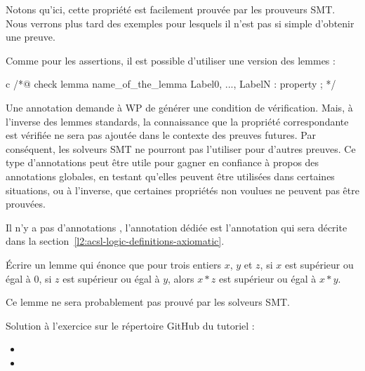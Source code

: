 Notons qu'ici, cette propriété est facilement prouvée par les prouveurs SMT. Nous
verrons plus tard des exemples pour lesquels il n'est pas si simple d'obtenir une
preuve.




Comme pour les assertions, il est possible d'utiliser une version
 des lemmes :


\begin{CodeBlock}{c}
/*@
  check lemma name_of_the_lemma { Label0, ..., LabelN }:
    property ;
*/
\end{CodeBlock}


Une annotation  demande à WP de générer une condition de
vérification. Mais, à l'inverse des lemmes standards, la connaissance que la
propriété correspondante est vérifiée ne sera pas ajoutée dans le contexte des
preuves futures. Par conséquent, les solveurs SMT ne pourront pas l'utiliser
pour d'autres preuves. Ce type d'annotations peut être utile pour gagner en
confiance à propos des annotations globales, en testant qu'elles peuvent être
utilisées dans certaines situations, ou à l'inverse, que certaines propriétés
non voulues ne peuvent pas être prouvées.


Il n'y a pas d'annotations , l'annotation dédiée est
l'annotation  qui sera décrite dans la
section~\ref{l2:acsl-logic-definitions-axiomatic}.





Écrire un lemme qui énonce que pour trois entiers $x$, $y$ et $z$, si $x$ est
supérieur ou égal à $0$, si $z$ est supérieur ou égal à $y$, alors $x * z$
est supérieur ou égal à $x * y$.


Ce lemme ne sera probablement pas prouvé par les solveurs SMT.


\begin{Information}
  Solution à l'exercice sur le répertoire GitHub du tutoriel :
  \begin{itemize}
    \item {}
    \item {}
  \end{itemize}
\end{Information}


\label{l4:acsl-properties-lemmas-lsorted-gsorted}


